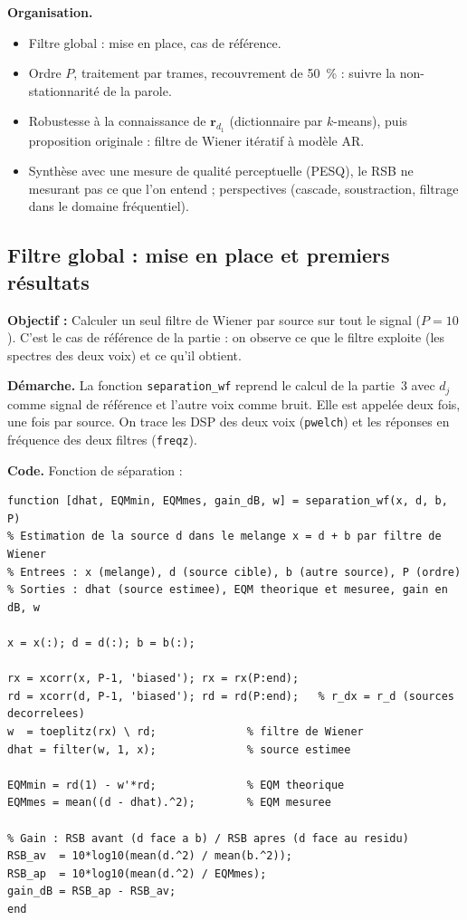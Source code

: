 \textbf{Organisation.}
\begin{itemize}
  \item Filtre global : mise en place, cas de référence.
  \item Ordre $P$, traitement par trames, recouvrement de 50~\% : suivre la non-stationnarité de la parole.
  \item Robustesse à la connaissance de $\mathbf{r}_{d_1}$ (dictionnaire par $k$-means), puis proposition originale : filtre de Wiener itératif à modèle AR.
  \item Synthèse avec une mesure de qualité perceptuelle (PESQ), le RSB ne mesurant pas ce que l'on entend ; perspectives (cascade, soustraction, filtrage dans le domaine fréquentiel).
\end{itemize}

\subsection{Filtre global : mise en place et premiers résultats}

\begin{enonce}
\textbf{Objectif :} Calculer un seul filtre de Wiener par source sur tout le signal ($P=10$). C'est le cas de référence de la partie : on observe ce que le filtre exploite (les spectres des deux voix) et ce qu'il obtient.
\end{enonce}

\textbf{Démarche.} La fonction \texttt{separation\_wf} reprend le calcul de la partie~3 avec $d_j$ comme signal de référence et l'autre voix comme bruit. Elle est appelée deux fois, une fois par source. On trace les DSP des deux voix (\texttt{pwelch}) et les réponses en fréquence des deux filtres (\texttt{freqz}).

\textbf{Code.} Fonction de séparation :
\begin{lstlisting}
function [dhat, EQMmin, EQMmes, gain_dB, w] = separation_wf(x, d, b, P)
% Estimation de la source d dans le melange x = d + b par filtre de Wiener
% Entrees : x (melange), d (source cible), b (autre source), P (ordre)
% Sorties : dhat (source estimee), EQM theorique et mesuree, gain en dB, w

x = x(:); d = d(:); b = b(:);

rx = xcorr(x, P-1, 'biased'); rx = rx(P:end);
rd = xcorr(d, P-1, 'biased'); rd = rd(P:end);   % r_dx = r_d (sources decorrelees)
w  = toeplitz(rx) \ rd;              % filtre de Wiener
dhat = filter(w, 1, x);              % source estimee

EQMmin = rd(1) - w'*rd;              % EQM theorique
EQMmes = mean((d - dhat).^2);        % EQM mesuree

% Gain : RSB avant (d face a b) / RSB apres (d face au residu)
RSB_av  = 10*log10(mean(d.^2) / mean(b.^2));
RSB_ap  = 10*log10(mean(d.^2) / EQMmes);
gain_dB = RSB_ap - RSB_av;
end
\end{lstlisting}

